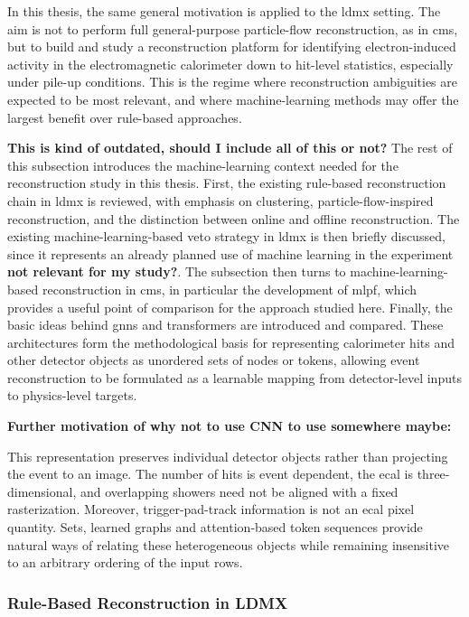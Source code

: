 In this thesis, the same general motivation is applied to the \gls{ldmx} setting. The aim is not to perform full general-purpose particle-flow reconstruction, as in \gls{cms}, but to build and study a reconstruction platform for identifying electron-induced activity in the electromagnetic calorimeter down to hit-level statistics, especially under pile-up conditions. This is the regime where reconstruction ambiguities are expected to be most relevant, and where machine-learning methods may offer the largest benefit over rule-based approaches.

\textbf{This is kind of outdated, should I include all of this or not?} The rest of this subsection introduces the machine-learning context needed for the reconstruction study in this thesis. First, the existing rule-based reconstruction chain in \gls{ldmx} is reviewed, with emphasis on clustering, particle-flow-inspired reconstruction, and the distinction between online and offline reconstruction. The existing machine-learning-based veto strategy in \gls{ldmx} is then briefly discussed, since it represents an already planned use of machine learning in the experiment \textbf{not relevant for my study?}. The subsection then turns to machine-learning-based reconstruction in \gls{cms}, in particular the development of \gls{mlpf}, which provides a useful point of comparison for the approach studied here. Finally, the basic ideas behind \glspl{gnn} and transformers are introduced and compared. These architectures form the methodological basis for representing calorimeter hits and other detector objects as unordered sets of nodes or tokens, allowing event reconstruction to be formulated as a learnable mapping from detector-level inputs to physics-level targets.

\textbf{Further motivation of why not to use CNN to use somewhere maybe:}

This representation preserves individual detector objects rather than
projecting the event to an image. The number of hits is event dependent, the
\gls{ecal} is three-dimensional, and overlapping showers need not be aligned
with a fixed rasterization. Moreover, trigger-pad-track information is not an
\gls{ecal} pixel quantity. Sets, learned graphs and attention-based token
sequences provide natural ways of relating these heterogeneous objects while
remaining insensitive to an arbitrary ordering of the input rows.


\subsubsection{Rule-Based Reconstruction in LDMX}

